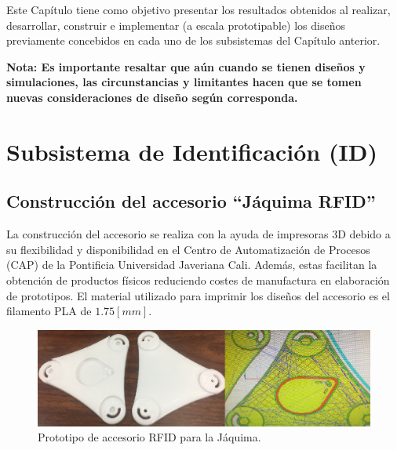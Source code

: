 
Este Capítulo tiene como objetivo presentar los resultados obtenidos al realizar, desarrollar, construir e implementar (a escala prototipable) los diseños previamente concebidos en cada uno de los subsistemas del Capítulo anterior. 

\textbf{Nota: Es importante resaltar que aún cuando se tienen diseños y simulaciones, las circunstancias y limitantes hacen que se tomen nuevas consideraciones de diseño según corresponda.}


\section{Subsistema de Identificación (ID)}
\subsection{Construcción del accesorio ``Jáquima RFID''}

La construcción del accesorio se realiza con la ayuda de impresoras 3D debido a su flexibilidad y disponibilidad en el Centro de Automatización de Procesos (CAP) de la Pontificia Universidad Javeriana Cali. Además, estas facilitan la obtención de productos físicos reduciendo costes de manufactura en elaboración de prototipos. El material utilizado para imprimir los diseños del accesorio es el filamento PLA de $1.75[mm]$.


\begin{figure}
	\begin{center}
		\includegraphics[scale=0.55]{img/jrfid.png}
	\end{center}
	\caption{Prototipo de accesorio RFID para la Jáquima. \label{jrfidpng}}
\end{figure}
\pagebreak

